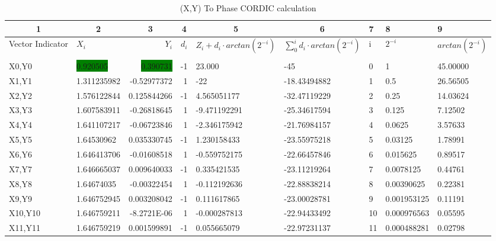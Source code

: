 \begin{landscape}
\begin{table}
  \caption{(X,Y) To Phase CORDIC calculation}
  \label{tab:Cosine2Phase}%
    \begin{tabular}{|l|l|r|r|l|l|l|l|l|}
    \toprule
    \multicolumn{1}{c}{1} & \multicolumn{1}{c}{2} & \multicolumn{1}{c}{3} & \multicolumn{1}{c}{4} & \multicolumn{1}{c}{5} & \multicolumn{1}{c}{6} & 7     & 8     & 9 \\
    \midrule
    Vector Indicator & $X_i$ & $Y_i$ & $d_i$ & $Z_i + d_i \cdot arctan(2^{-i})$ & $\sum_{0}^{i} d_i \cdot arctan(2^{-i})$ & i & $2^{-i}$ & $arctan(2^{-i})$ \\
    \multicolumn{1}{c}{} &       &       &       &       &       &       &       &  \\
    X0,Y0 & \colorbox{green}{0.920505} & \colorbox{green}{0.390731} & -1    & 23.000 & -45   & 0     & 1     & 45.00000 \\
    X1,Y1 & 1.311235982 & -0.52977372 & 1     & -22   & -18.43494882 & 1     & 0.5   & 26.56505 \\
    X2,Y2 & 1.576122844 & 0.125844266 & -1    & 4.565051177 & -32.47119229 & 2     & 0.25  & 14.03624 \\
    X3,Y3 & 1.607583911 & -0.26818645 & 1     & -9.471192291 & -25.34617594 & 3     & 0.125 & 7.12502 \\
    X4,Y4 & 1.641107217 & -0.06723846 & 1     & -2.346175942 & -21.76984157 & 4     & 0.0625 & 3.57633 \\
    X5,Y5 & 1.64530962 & 0.035330745 & -1    & 1.230158433 & -23.55975218 & 5     & 0.03125 & 1.78991 \\
    X6,Y6 & 1.646413706 & -0.01608518 & 1     & -0.559752175 & -22.66457846 & 6     & 0.015625 & 0.89517 \\
    X7,Y7 & 1.646665037 & 0.009640033 & -1    & 0.335421535 & -23.11219264 & 7     & 0.0078125 & 0.44761 \\
    X8,Y8 & 1.64674035 & -0.00322454 & 1     & -0.112192636 & -22.88838214 & 8     & 0.00390625 & 0.22381 \\
    X9,Y9 & 1.646752945 & 0.003208042 & -1    & 0.111617865 & -23.00028781 & 9     & 0.001953125 & 0.11191 \\
    X10,Y10 & 1.646759211 & -8.2721E-06 & 1     & -0.000287813 & -22.94433492 & 10    & 0.000976563 & 0.05595 \\
    X11,Y11 & 1.646759219 & 0.001599891 & -1    & 0.055665079 & -22.97231137 & 11    & 0.000488281 & 0.02798 \\

\end{tabular}
\end{table}
\end{landscape}
